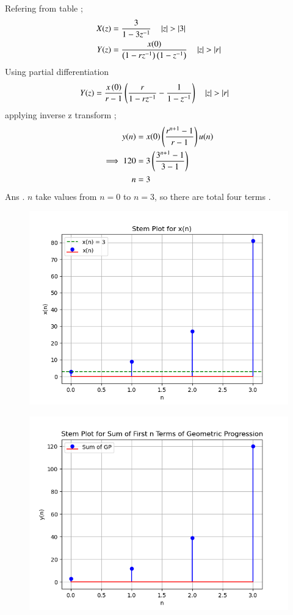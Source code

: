 \documentclass[journal,12pt,twocolumn]{IEEEtran}
\theoremstyle{remark}
\begin{document}
Refering from table ;
\begin{align}
X(z) &=\frac{3}{1-3z^{-1}} \quad \left\vert z\right\vert > \left\vert3\right\vert\\
Y(z) &= \frac{x(0)}{\left(1-rz^{-1}\right)\left(1-z^{-1}\right)} \quad \left\vert z\right\vert> \left\vert r\right\vert
\end{align}
Using partial differentiation 
\begin{align}
Y(z)&=\frac{x\left(0\right)}{r-1}\left(\frac{r}{1-r z^{-1}}-\frac{1}{1- z^{-1}}\right)  \quad \left\vert z\right\vert > \left\vert r\right\vert
\end{align}
applying inverse z transform ;
\begin{align}
y(n) &= x(0)\left(\frac{r^{n+1}-1}{r-1}\right)u(n)\\
\implies 120 &= 3\left( \frac{3^{n+1}- 1}{3-1}\right)  \\
n &= 3
\end{align}
Ans . $n$ take values from $n=0$ to  $n=3$, so there are total four terms .
\newpage
\begin{figure}
   \includegraphics[width=1\linewidth]{ncert-maths/11/9/5/7/figs/i1.png}
\end{figure}
\begin{figure}
   \includegraphics[width=1\linewidth]{ncert-maths/11/9/5/7/figs/i2.png}
\end{figure}
\end{document}
